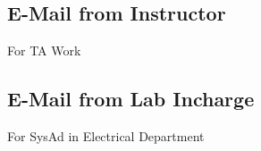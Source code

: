 \documentclass{article}
\begin{document}
	\subsection{E-Mail from Instructor}
		For TA Work
		\begin{figure}[h]
		\end{figure}
\newpage
	\subsection{E-Mail from Lab Incharge}
		For SysAd in Electrical Department
		\begin{figure}[h]
		\end{figure}
\newpage
\end{document}
